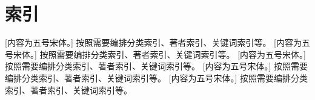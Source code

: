  \setlength{\baselineskip}{16pt}
\chapter{索引}



\indent
{}
[内容为五号宋体。] 按照需要编排分类索引、著者索引、关键词索引等。 
[内容为五号宋体。] 按照需要编排分类索引、著者索引、关键词索引等。 [内容为五号宋体。] 按照需要编排分类索引、著者索引、关键词索引等。 [内容为五号宋体。] 按照需要编排分类索引、著者索引、关键词索引等。 [内容为五号宋体。] 按照需要编排分类索引、著者索引、关键词索引等。 